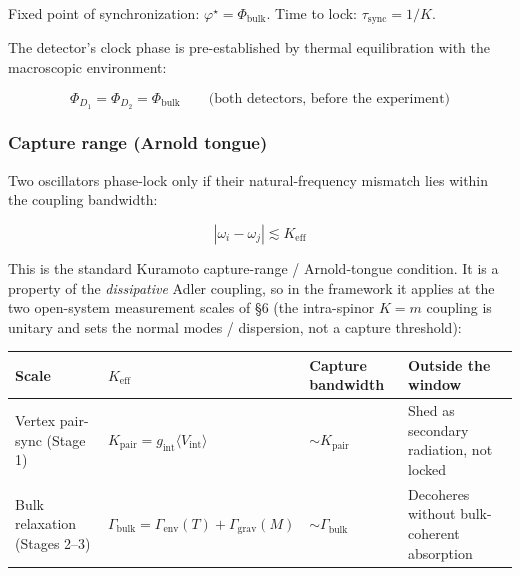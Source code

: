 \documentclass[
]{article}
\newcounter{none} %
\begin{document}
Fixed point of synchronization: \(\varphi^\star = \Phi_{\text{bulk}}\).
Time to lock: \(\tau_{\text{sync}} = 1/K\).

The detector's clock phase is pre-established by thermal equilibration
with the macroscopic environment:

\[\Phi_{D_1} = \Phi_{D_2} = \Phi_{\text{bulk}} \qquad \text{(both detectors, before the experiment)}\]

\subsubsection{Capture range (Arnold
tongue)}\label{capture-range-arnold-tongue}

Two oscillators phase-lock only if their natural-frequency mismatch lies
within the coupling bandwidth:

\[\boxed{|\omega_i - \omega_j| \lesssim K_{\text{eff}}}\]

This is the standard Kuramoto capture-range / Arnold-tongue condition.
It is a property of the \emph{dissipative} Adler coupling, so in the
framework it applies at the two open-system measurement scales of §6
(the intra-spinor \(K = m\) coupling is unitary and sets the normal
modes / dispersion, not a capture threshold):

{\def\LTcaptype{none} %
\begin{longtable}[]{@{}
  >{\raggedright\arraybackslash}p{}
  >{\raggedright\arraybackslash}p{}
  >{\raggedright\arraybackslash}p{}
  >{\raggedright\arraybackslash}p{}@{}}
\toprule\noalign{}
\begin{minipage}[b]{\linewidth}\raggedright
Scale
\end{minipage} & \begin{minipage}[b]{\linewidth}\raggedright
\(K_{\text{eff}}\)
\end{minipage} & \begin{minipage}[b]{\linewidth}\raggedright
Capture bandwidth
\end{minipage} & \begin{minipage}[b]{\linewidth}\raggedright
Outside the window
\end{minipage} \\
\midrule\noalign{}
\endhead
\bottomrule\noalign{}
\endlastfoot
Vertex pair-sync (Stage 1) &
\(K_{\text{pair}} = g_{\text{int}}\langle V_{\text{int}}\rangle\) &
\(\sim K_{\text{pair}}\) & Shed as secondary radiation, not locked \\
Bulk relaxation (Stages 2--3) &
\(\Gamma_{\text{bulk}} = \Gamma_{\text{env}}(T) + \Gamma_{\text{grav}}(M)\)
& \(\sim \Gamma_{\text{bulk}}\) & Decoheres without bulk-coherent
absorption \\
\end{longtable}
}
\end{document}
